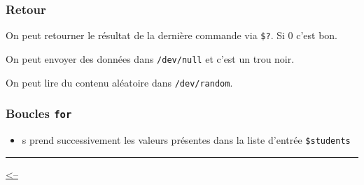 \begin{Shaded}
\begin{Highlighting}[]
  \VariableTok{$\#}  
  
  
\end{Highlighting}
\end{Shaded}

\subsubsection{Retour}\label{retour}

On peut retourner le résultat de la dernière commande via \texttt{\$?}.
Si 0 c'est bon.

On peut envoyer des données dans \texttt{/dev/null} et c'est un trou
noir.

On peut lire du contenu aléatoire dans \texttt{/dev/random}.

\subsubsection{\texorpdfstring{Boucles
\texttt{for}}{Boucles for}}\label{boucles-for}

\begin{Shaded}
\begin{Highlighting}[]
\OperatorTok{=} 
 \KeywordTok{;}  
  \OperatorTok{=}\KeywordTok{\textasciigrave{}} \KeywordTok{|}  \StringTok{\textquotesingle{} \textquotesingle{}} \KeywordTok{\textasciigrave{}} 
   
\end{Highlighting}
\end{Shaded}

\begin{itemize}
\tightlist
\item
  s prend successivement les valeurs présentes dans la liste d'entrée
  \texttt{\$students}
\end{itemize}

\begin{center}\rule{0.5\linewidth}{0.5pt}\end{center}

\href{../README.md}{\textless--}
